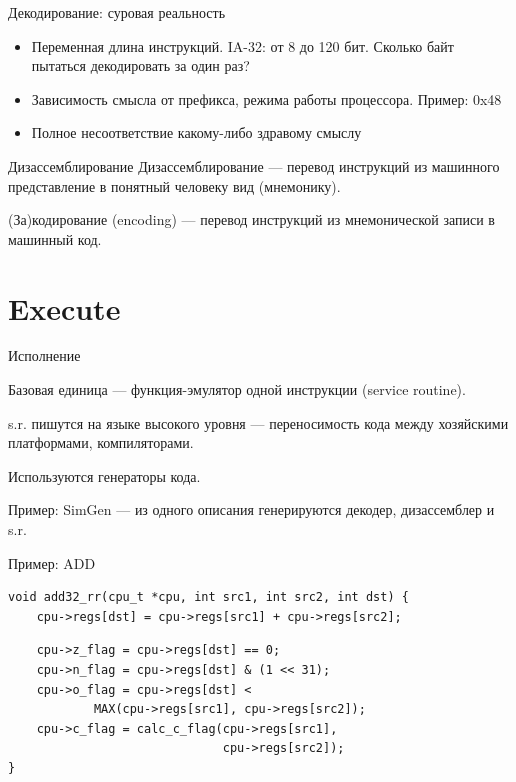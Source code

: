 \documentclass{beamer}
\begin{document}
\begin{frame}{Декодирование: суровая реальность}
\begin{itemize}
\item Переменная длина инструкций. IA-32: от 8 до 120 бит. Сколько байт пытаться декодировать за один раз?
\item Зависимость смысла от префикса, режима работы процессора. Пример: 0x48
\item Полное несоответствие какому-либо здравому смыслу
\end{itemize}

\end{frame}

\begin{frame}{Дизассемблирование}
Дизассемблирование — перевод инструкций из машинного представление в понятный
человеку вид (мнемонику).\pause

(За)кодирование (encoding) — перевод инструкций из мнемонической записи в
машинный код.
\end{frame}

\section{Execute}

\begin{frame}{Исполнение}

Базовая единица — функция-эмулятор одной инструкции (service routine).

\bigskip

s.r. пишутся на языке высокого уровня — переносимость кода между хозяйскими
платформами, компиляторами.

\bigskip

Используются генераторы кода.

Пример: SimGen — из одного описания генерируются декодер, дизассемблер и s.r.

\end{frame}

\begin{frame}[fragile]{Пример: ADD}
\begin{verbatim}
void add32_rr(cpu_t *cpu, int src1, int src2, int dst) {
    cpu->regs[dst] = cpu->regs[src1] + cpu->regs[src2];
\end{verbatim}
\pause
\begin{verbatim}
    cpu->z_flag = cpu->regs[dst] == 0;
    cpu->n_flag = cpu->regs[dst] & (1 << 31);
    cpu->o_flag = cpu->regs[dst] < 
            MAX(cpu->regs[src1], cpu->regs[src2]);
    cpu->c_flag = calc_c_flag(cpu->regs[src1],
                              cpu->regs[src2]);
}
\end{verbatim}

\end{frame}
\end{document}
